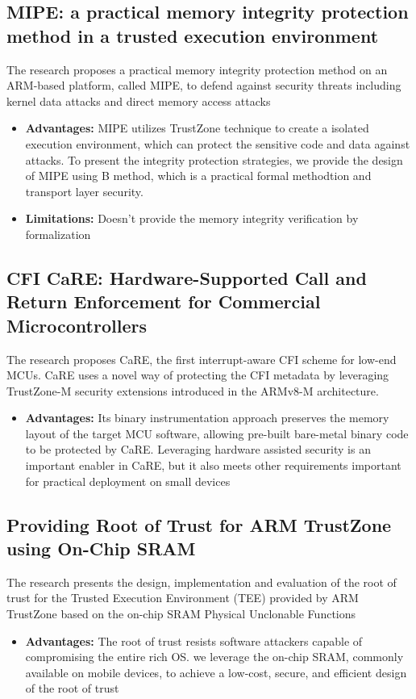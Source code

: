 \documentclass[conference]{IEEEtran}
\begin{document}
\subsection{MIPE: a practical memory integrity protection method in a trusted execution environment}
\cite{emb9} The research proposes a practical memory integrity protection method on an ARM-based platform, called MIPE, to defend against security threats including kernel data attacks and direct memory access attacks
\begin{itemize}
    \item \textbf{Advantages:} MIPE utilizes TrustZone technique to create a isolated execution environment, which can protect the sensitive code and data against attacks. To present the integrity protection strategies, we provide the design of MIPE using B method, which is a practical formal methodtion and transport layer security.
    \item \textbf{Limitations:} Doesn't provide the memory integrity verification by formalization
\end{itemize}


\subsection{CFI CaRE: Hardware-Supported Call and Return Enforcement for Commercial Microcontrollers}
\cite{emb10} The research proposes CaRE, the first interrupt-aware CFI scheme for low-end MCUs. CaRE uses a novel way of protecting the CFI metadata by leveraging TrustZone-M security extensions introduced in the ARMv8-M architecture.
\begin{itemize}
    \item \textbf{Advantages:} Its binary instrumentation approach preserves the memory layout of the target MCU software, allowing pre-built bare-metal binary code to be protected by CaRE. Leveraging hardware assisted security is an important enabler in CaRE, but it also meets other requirements important for practical deployment on small devices
\end{itemize}


\subsection{Providing Root of Trust for ARM TrustZone using On-Chip SRAM}
\cite{emb11} The research presents the design, implementation and evaluation of the root of trust for the Trusted Execution Environment (TEE) provided by ARM TrustZone based on the on-chip SRAM Physical Unclonable Functions
\begin{itemize}
    \item \textbf{Advantages:} The root of trust resists software attackers capable of compromising the entire rich OS. we leverage the on-chip SRAM, commonly available on mobile devices, to achieve a low-cost, secure, and efficient design of the root of trust
\end{itemize}
\end{document}
